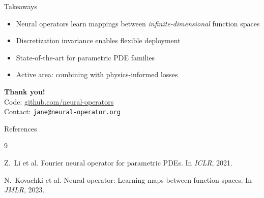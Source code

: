 \documentclass[11pt]{beamer}
\begin{document}
\begin{frame}{Takeaways}
    \begin{itemize}
        \item Neural operators learn mappings between \emph{infinite-dimensional} function spaces
        \item Discretization invariance enables flexible deployment
        \item State-of-the-art for parametric PDE families
        \item Active area: combining with physics-informed losses
    \end{itemize}

    \vspace{1cm}

    \begin{center}
        \Large{\textbf{Thank you!}}\\
        \vspace{0.3cm}
        \small{Code: \url{github.com/neural-operators}}\\
        \small{Contact: \texttt{jane@neural-operator.org}}
    \end{center}
\end{frame}

\begin{frame}[allowframebreaks]{References}
    
    \begin{thebibliography}{9}

    Z.~Li et al.
    \newblock Fourier neural operator for parametric PDEs.
    \newblock In \emph{ICLR}, 2021.

    N.~Kovachki et al.
    \newblock Neural operator: Learning maps between function spaces.
    \newblock In \emph{JMLR}, 2023.

    \end{thebibliography}
\end{frame}
\end{document}
